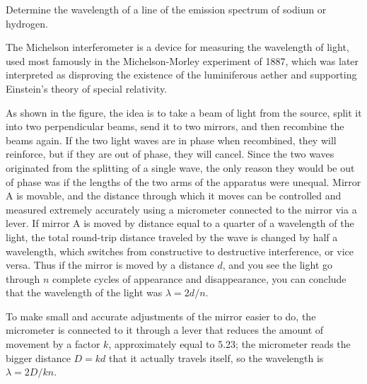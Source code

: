 \label{lab:michelson}

\apparatus
{}

\begin{goals}

\item[] Determine the wavelength of a line of the emission spectrum of sodium or hydrogen.

\end{goals}

The Michelson interferometer is a device for measuring the wavelength of
light, used most famously in the Michelson-Morley experiment of 1887,
which was later interpreted as disproving the existence of the luminiferous
aether and supporting Einstein's theory of special relativity.


As shown in the figure, the idea is to take a beam of light from the source,
split it into two perpendicular beams, send it to two mirrors, and then recombine
the beams again. If the two light waves are in phase when recombined, they will
reinforce, but if they are out of phase, they will cancel. Since the two waves
originated from the splitting of a single wave, the only reason they would be out
of phase was if the lengths of the two arms of the apparatus were unequal. Mirror
A is movable, and the distance through which it moves can be controlled and measured
extremely accurately using a micrometer connected to the mirror via a lever.
If mirror A is moved by distance equal to a quarter of a wavelength of the light,
the total round-trip distance traveled by the wave is changed by half a wavelength,
which switches from constructive to destructive interference, or vice versa.
Thus if the mirror is moved by a distance $d$, and you see the light go through
$n$ complete cycles of appearance and disappearance, you can conclude that the
wavelength of the light was $\lambda=2d/n$.

To make small and accurate adjustments
of the mirror easier to do, the micrometer is connected to it through a lever that
reduces the amount of movement by a factor $k$, approximately equal to 5.23; the micrometer reads the
bigger distance $D=kd$ that it actually travels itself, so the wavelength is
$\lambda=2D/kn$.

